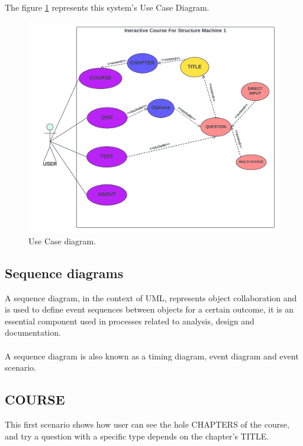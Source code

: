 The figure \ref{fig:UseCaseD} represents this system's Use Case Diagram.

\newpage
\begin{figure}[ht]
	\centering
	\label{}\includegraphics[scale=0.5]{img/Use Case.pdf}                
	\caption{Use Case diagram.} 
	\label{fig:UseCaseD}
\end{figure} 

\subsection{Sequence diagrams}
A sequence diagram, in the context of UML, represents object collaboration and is used to define event sequences between objects for a certain outcome, it is an essential component used in processes related to analysis, design and documentation.\cite{Techopedia-DS} \\\\
A sequence diagram is also known as a timing diagram, event diagram and event scenario.\cite{Techopedia-DS}

\subsection{COURSE}
This first scenario shows how user can see the hole CHAPTERS of the course, and try  a question with a specific type depends on the chapter's TITLE.

